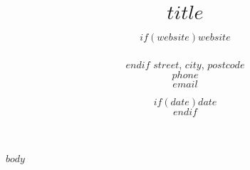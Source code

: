 \documentclass[11pt, a4paper]{article}
\title{$title$} %
\date{$if(date)$$date$\\$endif$} %
\author{$if(website)$$website$\\\\$endif$
$street$, $city$, $postcode$\\ %
$phone$ \\ $email$ } %
\begin{document}
\maketitle
\begin{raggedright}
	\justify
$body$
\end{raggedright}
\end{document}

